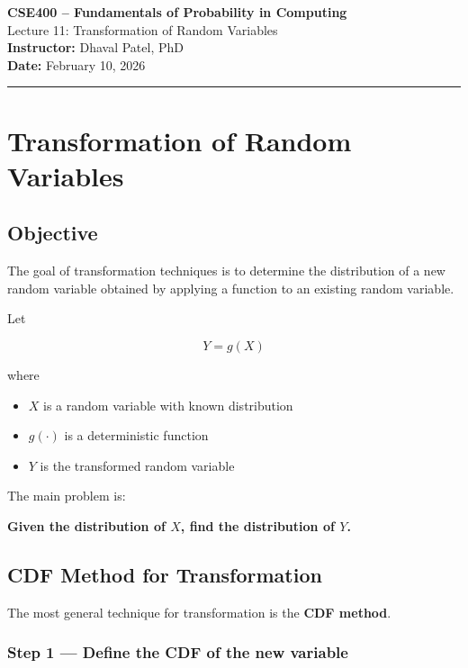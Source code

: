 \documentclass[12pt]{article}
\begin{document}
\begin{center}
{\Large \textbf{CSE400 -- Fundamentals of Probability in Computing}}\\[0.2cm]
{\large Lecture 11: Transformation of Random Variables}\\[0.3cm]

\textbf{Instructor:} Dhaval Patel, PhD\\
\textbf{Date:} February 10, 2026
\end{center}

\hrule
\vspace{0.4cm}

\section{Transformation of Random Variables}

\subsection{Objective}

The goal of transformation techniques is to determine the distribution of a new random variable obtained by applying a function to an existing random variable.

Let

\[
Y = g(X)
\]

where

\begin{itemize}
\item $X$ is a random variable with known distribution
\item $g(\cdot)$ is a deterministic function
\item $Y$ is the transformed random variable
\end{itemize}

The main problem is:

\textbf{Given the distribution of $X$, find the distribution of $Y$.}

\subsection{CDF Method for Transformation}

The most general technique for transformation is the \textbf{CDF method}.

\subsubsection*{Step 1 --- Define the CDF of the new variable}
\end{document}

